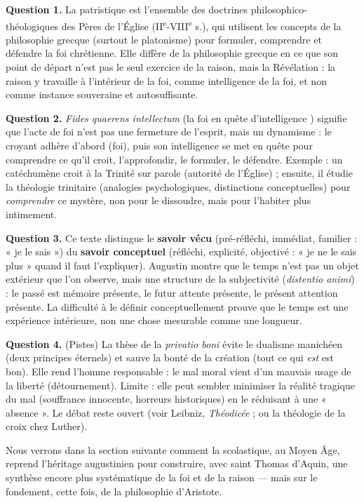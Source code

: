 \documentclass[11pt]{article}
\newcommand{\cle}[1]{{\popxbold\color{popdark}#1}}
\begin{document}
\begin{corrige}[Exercice 1]
\textbf{Question 1.} La patristique est l'ensemble des doctrines philosophico-théologiques des Pères de l'Église (II\textsuperscript{e}-VIII\textsuperscript{e} s.), qui utilisent les concepts de la philosophie grecque (surtout le platonisme) pour formuler, comprendre et défendre la foi chrétienne. Elle diffère de la philosophie grecque en ce que son point de départ n'est pas le seul exercice de la raison, mais la Révélation : la raison y travaille à l'intérieur de la foi, comme intelligence de la foi, et non comme instance souveraine et autosuffisante.

\textbf{Question 2.} \emph{Fides quaerens intellectum} (\guillemotleft la foi en quête d'intelligence \guillemotright) signifie que l'acte de foi n'est pas une fermeture de l'esprit, mais un dynamisme : le croyant adhère d'abord (foi), puis son intelligence se met en quête pour comprendre ce qu'il croit, l'approfondir, le formuler, le défendre. Exemple : un catéchumène croit à la Trinité sur parole (autorité de l'Église) ; ensuite, il étudie la théologie trinitaire (analogies psychologiques, distinctions conceptuelles) pour \emph{comprendre} ce mystère, non pour le dissoudre, mais pour l'habiter plus intimement.

\textbf{Question 3.} Ce texte distingue le \textbf{savoir vécu} (pré-réfléchi, immédiat, familier : « je le sais ») du \textbf{savoir conceptuel} (réfléchi, explicité, objectivé : « je ne le sais plus » quand il faut l'expliquer). Augustin montre que le temps n'est pas un objet extérieur que l'on observe, mais une structure de la subjectivité (\emph{distentio animi}) : le passé est mémoire présente, le futur attente présente, le présent attention présente. La difficulté à le définir conceptuellement prouve que le temps est une expérience intérieure, non une chose mesurable comme une longueur.

\textbf{Question 4.} (Pistes) La thèse de la \emph{privatio boni} évite le dualisme manichéen (deux principes éternels) et sauve la bonté de la création (tout ce qui \emph{est} est bon). Elle rend l'homme responsable : le mal moral vient d'un mauvais usage de la liberté (détournement). Limite : elle peut sembler minimiser la réalité tragique du mal (souffrance innocente, horreurs historiques) en le réduisant à une « absence ». Le débat reste ouvert (voir Leibniz, \emph{Théodicée} ; ou la théologie de la croix chez Luther).
\end{corrige}

Nous verrons dans la section suivante comment la \cle{scolastique}, au Moyen Âge, reprend l'héritage augustinien pour construire, avec saint Thomas d'Aquin, une synthèse encore plus systématique de la foi et de la raison — mais sur le fondement, cette fois, de la philosophie d'Aristote.
\end{document}
